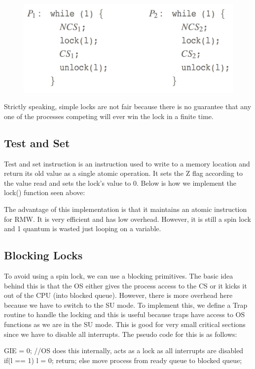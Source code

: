 \documentclass{hw}
\begin{document}
\begin{figure}[H]
  \centering
  \includegraphics[scale=.4]{lock}
\end{figure}

Strictly speaking, simple locks are not fair because there is no guarantee that
any one of the processes competing will ever win the lock in a finite time. 

\subsection{Test and Set}
Test and set instruction is an instruction used to write to a memory location 
and return its old value as a single atomic operation. It sets the Z flag 
according to the value read and sets the lock's value to 0. Below is how we
implement the lock() function seen above:
The advantage of this implementation is that it maintains an atomic instruction 
for RMW. It is very efficient and has low overhead. However, it is still a 
spin lock and 1 quantum is wasted just looping on a variable.
    
\subsection{Blocking Locks}
To avoid using a spin lock, we can use a blocking primitives. The basic idea behind
this is that the OS either gives the process access to the CS or it kicks it out
of the CPU (into blocked queue). However, there is more overhead here because we
have to switch to the SU mode. To implement this, we define a Trap routine to handle
the locking and this is useful because traps have access to OS functions as we are
in the SU mode. This is good for very small critical sections since we have to 
disable all interrupts. The pseudo code for this is as follows:
\begin{C}
GIE = 0; //OS does this internally, acts as a lock as all interrupts are disabled
if(l == 1){
  l = 0;
  return;
}
else{
  move process from ready queue to blocked queue;
}
\end{C}
\end{document}

